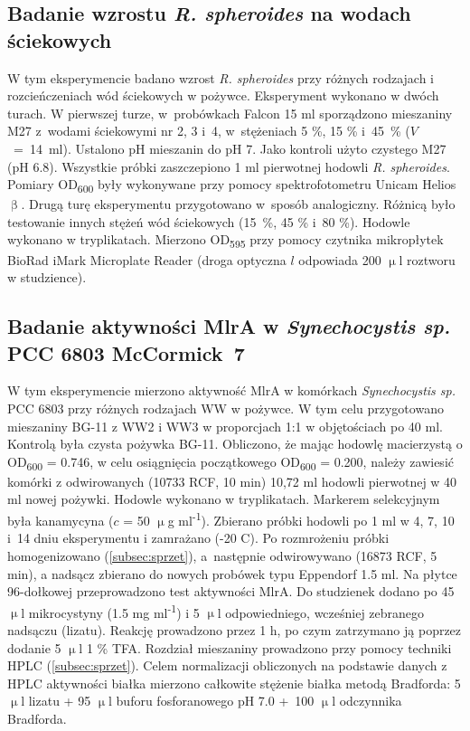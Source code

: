\subsection{Badanie wzrostu \textit{R. spheroides} na wodach ściekowych}\label{subsec:rhodobacter}
W tym eksperymencie badano wzrost \textit{R. spheroides} przy
różnych rodzajach i rozcieńczeniach wód ściekowych w pożywce.
Eksperyment wykonano w dwóch turach.
W pierwszej turze, w~probówkach Falcon 15 ml sporządzono
mieszaniny M27 z~wodami ściekowymi nr 2, 3 i~4,
w~stężeniach 5 \%, 15 \% i~45~\% ($V$~=~14~ml).
Ustalono pH mieszanin do pH 7.
Jako kontroli użyto czystego M27 (pH 6.8).
Wszystkie próbki zaszczepiono 1 ml pierwotnej hodowli
\textit{R. spheroides}.
Pomiary OD\textsubscript{600} były wykonywane przy pomocy
spektrofotometru Unicam Helios $\upbeta$.
Drugą turę eksperymentu przygotowano w~sposób analogiczny.
Różnicą było testowanie innych stężeń wód ściekowych
(15~\%, 45 \% i~80 \%).
Hodowle wykonano w tryplikatach.
Mierzono OD\textsubscript{595} przy pomocy czytnika
mikropłytek BioRad iMark Microplate Reader
(droga optyczna $l$ odpowiada 200 $\upmu$l roztworu w studzience).

\subsection{Badanie aktywności MlrA w \textit{Synechocystis sp.} PCC 6803 McCormick~7}\label{subsec:mlra}
W tym eksperymencie mierzono aktywność MlrA w komórkach
\textit{Synechocystis sp.} PCC 6803 przy
różnych rodzajach WW w pożywce.
W tym celu przygotowano mieszaniny BG-11 z WW2 i WW3
w proporcjach 1:1 w objętościach po 40 ml.
Kontrolą była czysta pożywka BG-11.
Obliczono, że mając hodowlę macierzystą
o OD\textsubscript{600} = 0.746, w celu osiągnięcia
początkowego OD\textsubscript{600} = 0.200, należy zawiesić
komórki z odwirowanych (10733 RCF, 10 min) 10,72 ml hodowli
pierwotnej w 40 ml nowej pożywki.
Hodowle wykonano w tryplikatach.
Markerem selekcyjnym była kanamycyna ($c$ = 50 $\upmu$g ml\textsuperscript{-1}).
Zbierano próbki hodowli po 1 ml w 4, 7, 10 i~14 dniu eksperymentu
i zamrażano (-20 \degree C).
Po rozmrożeniu próbki homogenizowano (\ref{subsec:sprzet}),
a~następnie odwirowywano (16873 RCF, 5 min), a nadsącz
zbierano do nowych probówek typu Eppendorf 1.5 ml.
Na płytce 96-dołkowej przeprowadzono test aktywności MlrA\@.
Do studzienek dodano po 45 $\upmu$l mikrocystyny (1.5 mg ml\textsuperscript{-1})
i 5 $\upmu$l odpowiedniego, wcześniej zebranego nadsączu (lizatu).
Reakcję prowadzono przez 1 h, po czym zatrzymano ją
poprzez dodanie 5 $\upmu$l 1 \% TFA\@.
Rozdział mieszaniny prowadzono przy pomocy techniki HPLC (\ref{subsec:sprzet}).
Celem normalizacji obliczonych na podstawie danych z HPLC aktywności białka
mierzono całkowite stężenie białka metodą Bradforda:
5 $\upmu$l lizatu + 95 $\upmu$l buforu fosforanowego pH 7.0
+~100 $\upmu$l odczynnika Bradforda.

